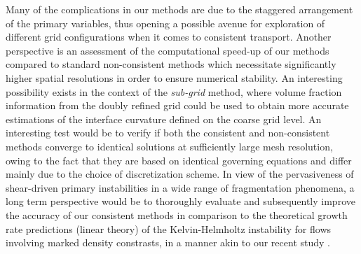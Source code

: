 Many of the complications in our methods are due to the staggered arrangement of the primary variables, 
thus opening a possible avenue for exploration of different grid configurations when it comes to consistent transport.
Another perspective is an assessment of the computational speed-up 
of our methods compared to standard non-consistent methods which necessitate 
significantly higher spatial resolutions in order to ensure numerical stability.  
An interesting possibility exists in the context of the \textit{sub-grid} method, 
where volume fraction information from the doubly refined grid could be used to
obtain more accurate estimations of the interface curvature defined on the coarse grid level. 
An interesting test would be to verify if both the consistent and non-consistent methods
converge to identical solutions at sufficiently large mesh resolution, owing to the fact that they 
are based on identical governing equations and differ mainly due to the choice of discretization scheme. 
In view of the pervasiveness of shear-driven primary instabilities in a wide range 
of fragmentation phenomena, a long term perspective would be to thoroughly evaluate 
and subsequently improve the accuracy of our consistent methods in comparison to the theoretical 
growth rate predictions (linear theory) of the Kelvin-Helmholtz instability for flows
involving marked density constrasts, in a manner akin to our recent study \cite{caf_momcons}. 


